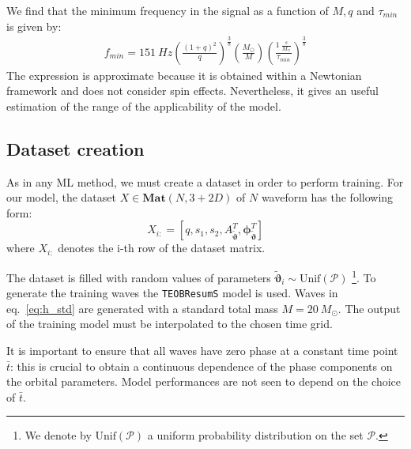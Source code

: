 \par
We find that the minimum frequency in the signal as a function of $M, q$ and $\tau_{min}$ is given by:
\begin{align}\label{eq:f_min}
	f_{min} = \SI{151}{Hz}  \left( \frac{(1+q)^2}{q} \right)^{\frac{3}{8}}  \left( \frac{M_\odot}{M} \right)  \left(\frac{\SI{1}{ \frac{s}{M_\odot}}}{\tau_{min}} \right)^{\frac{3}{8}}  
\end{align} 
The expression is approximate because it is obtained within a Newtonian framework and does not consider spin effects.
Nevertheless, it gives an useful estimation of the range of the applicability of the model.

\subsection{Dataset creation}
As in any ML method, we must create a dataset in order to perform training.
For our model, the dataset ${X \in \mathbf{Mat}(N,3+2D)}$ of $N$ waveform has the following form:
\begin{equation} \label{eq:dataset}
	X_{i:} = [q,s_1,s_2, {A}_{{\tilde{\boldsymbol{\vartheta}}}}^T, \boldsymbol{\phi}_{{\tilde{\boldsymbol{\vartheta}}}}^T]
\end{equation}
where $X_{i:}$ denotes the i-th row of the dataset matrix.
\par
The dataset is filled with random values of parameters ${\tilde{\boldsymbol{\vartheta}}}_i \sim \textrm{Unif}(\mathcal{P})$
\footnote{We denote by $\textrm{Unif}(\mathcal{P})$ a uniform probability distribution on the set $\mathcal{P}$.}.
To generate the training waves the \texttt{TEOBResumS} model is used.
Waves in eq.~\eqref{eq:h_std} are generated with a standard total mass $M = \SI{20}{M_\odot}$.
The output of the training model must be interpolated to the chosen time grid.
\par
It is important to ensure that all waves have zero phase at a constant time point $\bar{t}$: this is crucial to obtain a continuous dependence of the phase components on the orbital parameters. Model performances are not seen to depend on the choice of $\bar{t}$.

